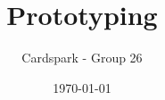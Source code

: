 \documentclass{article}
\begin{document}
\title{Prototyping}

\author{Cardspark - Group 26}

\date{\today}

\maketitle  
\end{document}
